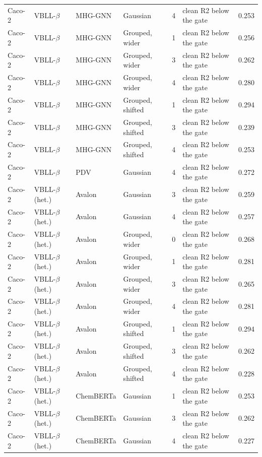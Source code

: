 {\begin{longtable}{llllcll}
Caco-2 & VBLL-$\beta$ & MHG-GNN & Gaussian & 4 & clean R2 below the gate & 0.253 \\
Caco-2 & VBLL-$\beta$ & MHG-GNN & Grouped, wider & 1 & clean R2 below the gate & 0.256 \\
Caco-2 & VBLL-$\beta$ & MHG-GNN & Grouped, wider & 3 & clean R2 below the gate & 0.262 \\
Caco-2 & VBLL-$\beta$ & MHG-GNN & Grouped, wider & 4 & clean R2 below the gate & 0.280 \\
Caco-2 & VBLL-$\beta$ & MHG-GNN & Grouped, shifted & 1 & clean R2 below the gate & 0.294 \\
Caco-2 & VBLL-$\beta$ & MHG-GNN & Grouped, shifted & 3 & clean R2 below the gate & 0.239 \\
Caco-2 & VBLL-$\beta$ & MHG-GNN & Grouped, shifted & 4 & clean R2 below the gate & 0.253 \\
Caco-2 & VBLL-$\beta$ & PDV & Gaussian & 4 & clean R2 below the gate & 0.272 \\
Caco-2 & VBLL-$\beta$ (het.) & Avalon & Gaussian & 3 & clean R2 below the gate & 0.259 \\
Caco-2 & VBLL-$\beta$ (het.) & Avalon & Gaussian & 4 & clean R2 below the gate & 0.257 \\
Caco-2 & VBLL-$\beta$ (het.) & Avalon & Grouped, wider & 0 & clean R2 below the gate & 0.268 \\
Caco-2 & VBLL-$\beta$ (het.) & Avalon & Grouped, wider & 1 & clean R2 below the gate & 0.281 \\
Caco-2 & VBLL-$\beta$ (het.) & Avalon & Grouped, wider & 3 & clean R2 below the gate & 0.265 \\
Caco-2 & VBLL-$\beta$ (het.) & Avalon & Grouped, wider & 4 & clean R2 below the gate & 0.281 \\
Caco-2 & VBLL-$\beta$ (het.) & Avalon & Grouped, shifted & 1 & clean R2 below the gate & 0.294 \\
Caco-2 & VBLL-$\beta$ (het.) & Avalon & Grouped, shifted & 3 & clean R2 below the gate & 0.262 \\
Caco-2 & VBLL-$\beta$ (het.) & Avalon & Grouped, shifted & 4 & clean R2 below the gate & 0.228 \\
Caco-2 & VBLL-$\beta$ (het.) & ChemBERTa & Gaussian & 1 & clean R2 below the gate & 0.253 \\
Caco-2 & VBLL-$\beta$ (het.) & ChemBERTa & Gaussian & 3 & clean R2 below the gate & 0.262 \\
Caco-2 & VBLL-$\beta$ (het.) & ChemBERTa & Gaussian & 4 & clean R2 below the gate & 0.227 \\

\end{longtable}}
